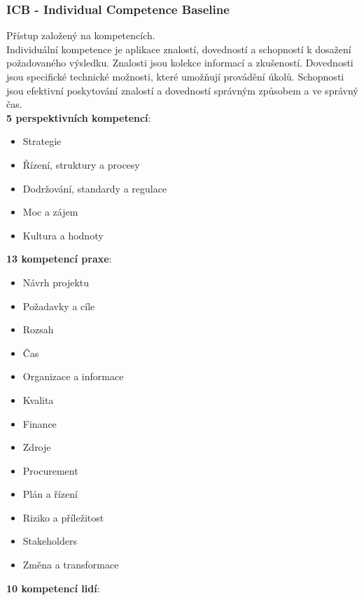 \documentclass[11pt,a4paper]{article}
\begin{document}
    \subsubsection{ICB - Individual Competence Baseline}
        Přístup založený na kompetencích.\\
        Individuální kompetence je aplikace znalostí, dovedností a schopností k dosažení požadovaného výsledku. Znalosti jsou kolekce informací a zkušeností. Dovednosti jsou specifické technické možnosti, které umožňují provádění úkolů. Schopnosti jsou efektivní poskytování znalostí a dovedností správným způsobem a ve správný čas.\\
        \textbf{5 perspektivních kompetencí}:
        \begin{multicols}{2}
        \begin{itemize}
            \item Strategie
            \item Řízení, struktury a procesy
            \item Dodržování, standardy a regulace
            \item Moc a zájem
            \item Kultura a hodnoty
        \end{itemize}
        \end{multicols}
        \textbf{13 kompetencí praxe}:
        \begin{multicols}{2}
        \begin{itemize}
            \item Návrh projektu
            \item Požadavky a cíle
            \item Rozsah
            \item Čas
            \item Organizace a informace
            \item Kvalita
            \item Finance
            \item Zdroje
            \item Procurement
            \item Plán a řízení
            \item Riziko a příležitost
            \item Stakeholders
            \item Změna a transformace
        \end{itemize}
        \end{multicols}
        \textbf{10 kompetencí lidí}:
\end{document}
